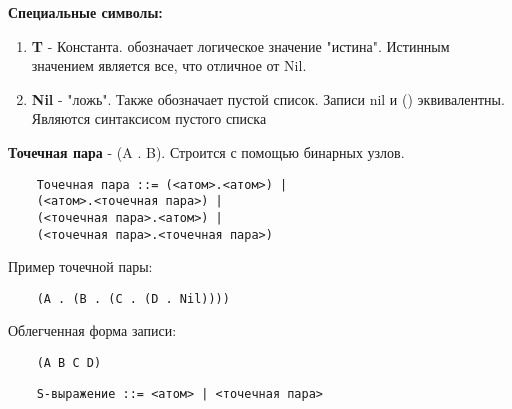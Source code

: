 \textbf{Специальные символы:}
\begin{enumerate}
	\item \textbf{T} - Константа. обозначает логическое значение "истина". Истинным значением является все, что отличное от Nil.
	\item \textbf{Nil} - "ложь". Также обозначает пустой список. Записи nil и () эквивалентны. Являются синтаксисом пустого списка
\end{enumerate}

\textbf{Точечная пара} - (A . B). Строится с помощью бинарных узлов.   

\begin{lstlisting}
	Точечная пара ::= (<атом>.<атом>) |
	(<атом>.<точечная пара>) |
	(<точечная пара>.<атом>) |
	(<точечная пара>.<точечная пара>)	
\end{lstlisting}

Пример точечной пары:
\begin{lstlisting}
	(A . (B . (C . (D . Nil))))
\end{lstlisting}
Облегченная форма записи:
\begin{lstlisting}
	(A B C D)
\end{lstlisting}




\begin{lstlisting}
	S-выражение ::= <атом> | <точечная пара>
\end{lstlisting}

